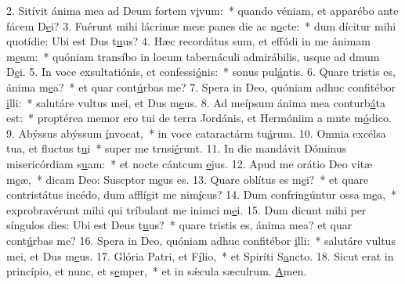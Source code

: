 2. Sitívit ánima mea ad Deum fortem v\uline{i}vum:~* quando véniam, et apparébo ante fácem D\uline{e}i?
3. Fuérunt mihi lácrimæ meæ panes die ac n\uline{o}cte:~* dum dícitur mihi quotídie: Ubi est Dus t\uline{u}us?
4. Hæc recordátus sum, et effúdi in me ánimam m\uline{e}am:~* quóniam transíbo in locum tabernáculi admirábilis, usque ad dmum D\uline{e}i.
5. In voce exsultatiónis, et confessi\uline{ó}nis:~* sonus pul\uline{á}ntis.
6. Quare tristis es, ánima m\uline{e}a?~* et quar cont\uline{ú}rbas me?
7. Spera in Deo, quóniam adhuc confitébor \uline{i}lli:~* salutáre vultus mei, et Dus m\uline{e}us.
8. Ad meípsum ánima mea conturb\uline{á}ta est:~* proptérea memor ero tui de terra Jordánis, et Hermóniim a mnte m\uline{ó}dico.
9. Abýssus abýssum \uline{í}nvocat,~* in voce cataractárm tu\uline{á}rum.
10. Omnia excélsa tua, et fluctus t\uline{u}i~* super me trnsi\uline{é}runt.
11. In die mandávit Dóminus misericórdiam s\uline{u}am:~* et nocte cántcum \uline{e}jus.
12. Apud me orátio Deo vitæ m\uline{e}æ,~* dicam Deo: Suscptor m\uline{e}us es.
13. Quare oblítus es m\uline{e}i?~* et quare contristátus incédo, dum afflígit me nim\uline{í}cus?
14. Dum confringúntur ossa m\uline{e}a,~* exprobravérunt mihi qui tríbulant me inimci m\uline{e}i.
15. Dum dicunt mihi per síngulos dies: Ubi est Deus t\uline{u}us?~* quare tristis es, ánima mea? et quar cont\uline{ú}rbas me?
16. Spera in Deo, quóniam adhuc confitébor \uline{i}lli:~* salutáre vultus mei, et Dus m\uline{e}us.
17. Glória Patri, et F\uline{í}lio,~* et Spiríti S\uline{a}ncto.
18. Sicut erat in princípio, et nunc, et s\uline{e}mper,~* et in sǽcula sæculrum. \uline{A}men.
